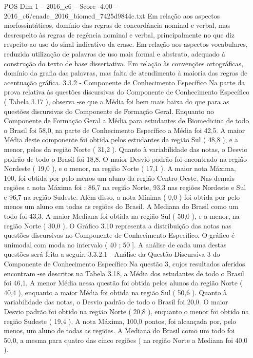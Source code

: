 \begin{textsample}{POS Dim 1 – 2016\_c6 – Score -4.00 – 2016\_c6/enade\_2016\_biomed\_7425d9844e.txt}
Em relação aos aspectos morfossintáticos, domínio das regras de concordância nominal e verbal, mas desrespeito às regras de regência nominal e verbal, principalmente no que diz respeito ao uso do sinal indicativo da crase.
Em relação aos aspectos vocabulares, reduzida utilização de palavras de uso mais formal e abstrato, adequado à construção do texto de base dissertativa.
Em relação às convenções ortográficas, domínio da grafia das palavras, mas falta de atendimento à maioria das regras de acentuação gráfica. 3.3.2 - Componente de Conhecimento Específico Na parte da prova relativa às questões discursivas do Componente de Conhecimento Específico ( Tabela 3.17 ), observa -se que a Média foi bem mais baixa do que para as questões discursivas do Componente de Formação Geral.
Enquanto no Componente de Formação Geral a Média para estudantes de Biomedicina de todo o Brasil foi 58,0, na parte de Conhecimento Específico a Média foi 42,5.
A maior Média deste componente foi obtida pelos estudantes da região Sul ( 48,8 ), e a menor, pelos da região Norte ( 31,2 ).
Quanto à variabilidade das notas, o Desvio padrão de todo o Brasil foi 18,8.
O maior Desvio padrão foi encontrado na região Nordeste ( 19,0 ), e o menor, na região Norte ( 17,1 ).
A maior nota Máxima, 100, foi obtida por pelo menos um aluno da região Centro-Oeste.
Nas demais regiões a nota Máxima foi : 86,7 na região Norte, 93,3 nas regiões Nordeste e Sul e 96,7 na região Sudeste.
Além disso, a nota Mínima ( 0,0 ) foi obtida por pelo menos um aluno em todas as regiões do Brasil.
A Mediana do Brasil como um todo foi 43,3.
A maior Mediana foi obtida na região Sul ( 50,0 ), e a menor, na região Norte ( 30,0 ).
O Gráfico 3.10 representa a distribuição das notas nas questões discursivas no Componente de Conhecimento Específico.
O gráfico é unimodal com moda no intervalo ( 40 ; 50 ].
A análise de cada uma destas questões será feita a seguir. 3.3.2.1 - Análise da Questão Discursiva 3 do Componente de Conhecimento Específico Na questão 3, cujos resultados aferidos encontram -se descritos na Tabela 3.18, a Média dos estudantes de todo o Brasil foi 46,1.
A menor Média nessa questão foi obtida pelos alunos da região Norte ( 40,4 ), enquanto a maior Média foi obtida na região Sul ( 50,6 ).
Quanto à variabilidade das notas, o Desvio padrão de todo o Brasil foi 20,0.
O maior Desvio padrão foi obtido na região Norte ( 20,8 ), enquanto o menor foi obtido na região Sudeste ( 19,4 ).
A nota Máxima, 100,0 pontos, foi alcançada por, pelo menos, um aluno de todas as regiões.
A Mediana do Brasil como um todo foi 50,0, a mesma para quatro das cinco regiões ( na região Norte a Mediana foi 40,0 ).

\end{textsample}
